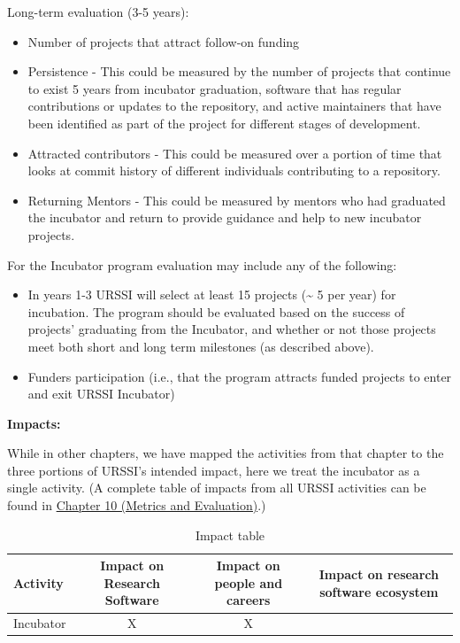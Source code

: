 \documentclass[
]{book}
\providecommand{\tightlist}{%
  \setlength{\itemsep}{0pt}\setlength{\parskip}{0pt}}
\begin{document}
Long-term evaluation (3-5 years):

\begin{itemize}
\tightlist
\item
  Number of projects that attract follow-on funding
\item
  Persistence - This could be measured by the number of projects that continue to exist 5 years from incubator graduation, software that has regular contributions or updates to the repository, and active maintainers that have been identified as part of the project for different stages of development.\\
\item
  Attracted contributors - This could be measured over a portion of time that looks at commit history of different individuals contributing to a repository.
\item
  Returning Mentors - This could be measured by mentors who had graduated the incubator and return to provide guidance and help to new incubator projects.
\end{itemize}

For the Incubator program evaluation may include any of the following:

\begin{itemize}
\tightlist
\item
  In years 1-3 URSSI will select at least 15 projects (\textasciitilde{} 5 per year) for incubation. The program should be evaluated based on the success of projects' graduating from the Incubator, and whether or not those projects meet both short and long term milestones (as described above).\\
\item
  Funders participation (i.e., that the program attracts funded projects to enter and exit URSSI Incubator)
\end{itemize}

\textbf{Impacts:}

While in other chapters, we have mapped the activities from that chapter to the three portions of URSSI's intended impact,
here we treat the incubator as a single activity.
(A complete table of impacts from all URSSI activities can be found in \href{Ch-Metrics}{Chapter 10 (Metrics and Evaluation)}.)

\begin{table}

\caption{\label{tab:unnamed-chunk-3}Impact table}
\centering
\begin{tabular}[t]{lccc}
\toprule
Activity & Impact on Research Software & Impact on people and careers & Impact on research software ecosystem\\
\midrule
Incubator & X & X & \\
\bottomrule
\end{tabular}
\end{table}
\end{document}
